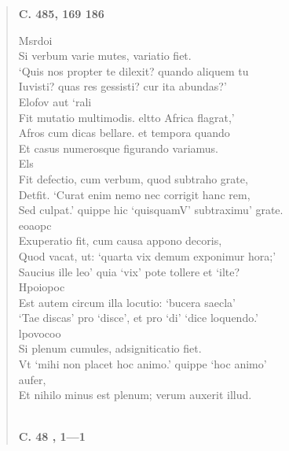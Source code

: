 \documentclass[11pt, a4paper]{report}
\begin{document}
\begin{verse}
    \begin{center} \textbf{C. 485, 169 186} \end{center} \marginpar{[19]} Msrdoi \\ Si verbum varie mutes, variatio fiet. \\ ‘Quis nos propter te dilexit? quando aliquem tu \\ Iuvisti? quas res gessisti? cur ita abundas?’ \\ Elofov aut ‘rali \\ Fit mutatio multimodis. eltto Africa flagrat,’ \\ Afros cum dicas bellare. et tempora quando \\ Et casus numerosque figurando variamus. \\ Els \\ Fit defectio, cum verbum, quod subtraho grate, \\ Detfit. ‘Curat enim nemo nec corrigit hanc rem, \\ Sed culpat.’ quippe hic ‘quisquamV’ subtraximu’ grate. \\ eoaopc \\ Exuperatio fit, cum causa appono decoris, \\ Quod vacat, ut: ‘quarta vix demum exponimur hora;’ \\ Saucius ille leo’ quia ‘vix’ pote tollere et ‘ilte? \\ Hpoiopoc \\ Est autem circum illa locutio: ‘bucera saecla’ \\ ‘Tae discas’ pro ‘disce’, et pro ‘di’ ‘dice loquendo.’ \\ lpovocoo \\ Si plenum cumules, adsigniticatio fiet. \\ Vt ‘mihi non placet hoc animo.’ quippe  \lbrack ‘hoc \rbrack  animo’ \\ aufer, \\ Et nihilo minus est plenum; verum auxerit illud. \\ 
        ﻿\pagebreak 
     \marginpar{[20]} \begin{center} \textbf{C. 48 , 1—1} \end{center}
      \end{verse}
  
\end{document}
